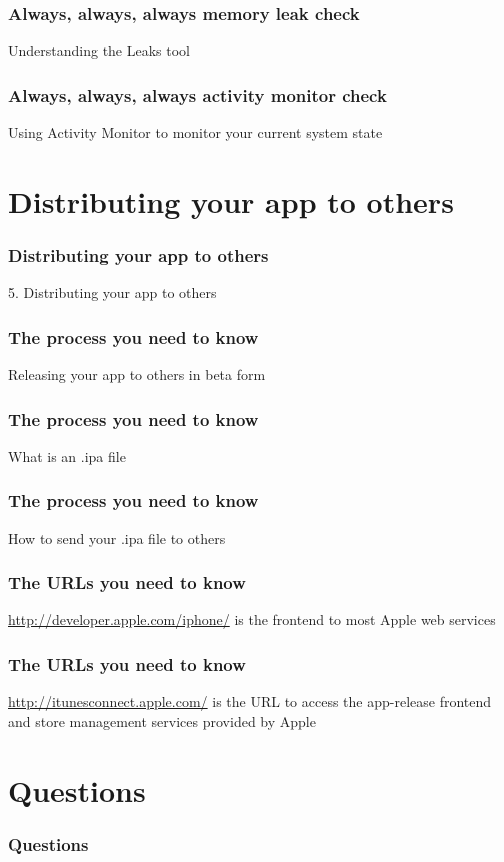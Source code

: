 \documentclass[10pt]{beamer}
\begin{document}
\begin{frame}[fragile]
  \frametitle{Always, always, always memory leak check}
  Understanding the Leaks tool

\end{frame}

    
\begin{frame}[fragile]
  \frametitle{Always, always, always activity monitor check}
  Using Activity Monitor to monitor your current system state

\end{frame}

    

   
  

  
    
\section{Distributing your app to others}
\begin{frame}[fragile]
  \frametitle{Distributing your app to others}
  5. Distributing your app to others
\end{frame}


    
\begin{frame}[fragile]
  \frametitle{The process you need to know}
  Releasing your app to others in beta form

\end{frame}

\begin{frame}[fragile]
  \frametitle{The process you need to know}
  What is an .ipa file

\end{frame}

\begin{frame}[fragile]
  \frametitle{The process you need to know}
  How to send your .ipa file to others

\end{frame}

    
\begin{frame}[fragile]
  \frametitle{The URLs you need to know}
  \url{http://developer.apple.com/iphone/} is the frontend to most Apple web services

\end{frame}

\begin{frame}[fragile]
  \frametitle{The URLs you need to know}
  \url{http://itunesconnect.apple.com/} is the URL to access the app-release frontend and store management services provided by Apple

\end{frame}

    

   
  

  
\section{Questions}
\begin{frame}[fragile]
  \frametitle{Questions}
  
\end{frame}


  


{}

\end{document}
